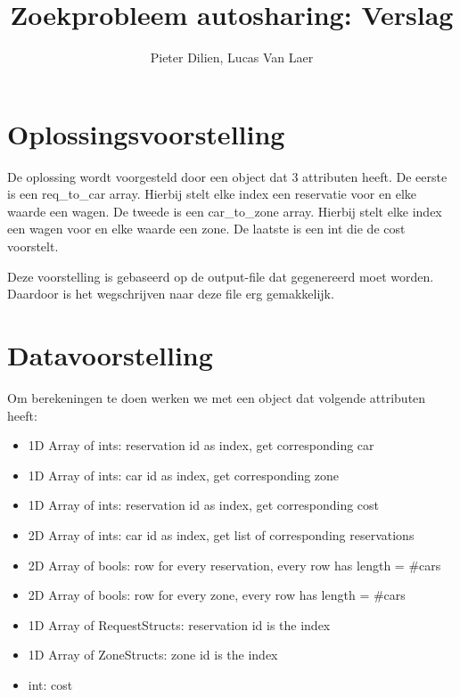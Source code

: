 \documentclass[a4paper, 12pt, one column]{article}
\title{Zoekprobleem autosharing: Verslag}
\author{Pieter Dilien, Lucas Van Laer}
\begin{document}
\maketitle

\section{Oplossingsvoorstelling}
De oplossing wordt voorgesteld door een object dat 3 attributen heeft. De eerste is een req\_to\_car array. Hierbij stelt elke index een reservatie voor en elke waarde een wagen. De tweede is een car\_to\_zone array. Hierbij stelt elke index een wagen voor en elke waarde een zone. De laatste is een int die de cost voorstelt.


Deze voorstelling is gebaseerd op de output-file dat gegenereerd moet worden. Daardoor is het wegschrijven naar deze file erg gemakkelijk.

\section{Datavoorstelling}
Om berekeningen te doen werken we met een object dat volgende attributen heeft:
\begin{itemize}
    \item 1D Array of ints: reservation id as index, get corresponding car
    \item 1D Array of ints: car id as index, get corresponding zone
    \item 1D Array of ints: reservation id as index, get corresponding cost
    \item 2D Array of ints: car id as index, get list of corresponding reservations
    \item 2D Array of bools: row for every reservation, every row has length = \#cars
    \item 2D Array of bools: row for every zone, every row has length = \#cars
    \item 1D Array of RequestStructs: reservation id is the index
    \item 1D Array of ZoneStructs: zone id is the index
    \item int: cost
\end{itemize}
\end{document}
